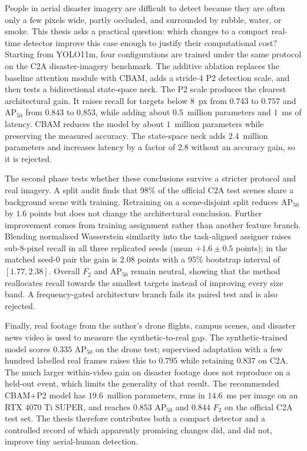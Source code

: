 
People in aerial disaster imagery are difficult to detect because they are
often only a few pixels wide, partly occluded, and surrounded by rubble, water,
or smoke. This thesis asks a practical question: which changes to a compact
real-time detector improve this case enough to justify their computational
cost? Starting from YOLO11m, four configurations are trained under the same
protocol on the C2A disaster-imagery benchmark. The additive ablation replaces
the baseline attention module with CBAM, adds a stride-4 P2 detection scale,
and then tests a bidirectional state-space neck. The P2 scale produces the
clearest architectural gain. It raises recall for targets below 8~px from
$0.743$ to $0.757$ and $\mathrm{AP}_{50}$ from $0.843$ to $0.853$, while adding
about $0.5$~million parameters and $1$~ms of latency. CBAM reduces the model by
about $1$~million parameters while preserving the measured accuracy. The
state-space neck adds $2.4$~million parameters and increases latency by a
factor of 2.8 without an accuracy gain, so it is rejected.

The second phase tests whether these conclusions survive a stricter protocol
and real imagery. A split audit finds that 98\% of the official C2A test scenes
share a background scene with training. Retraining on a scene-disjoint split
reduces $\mathrm{AP}_{50}$ by $1.6$ points but does not change the architectural
conclusion. Further improvement comes from training assignment rather than
another feature branch. Blending normalised Wasserstein similarity into the
task-aligned assigner raises sub-8-pixel recall in all three replicated seeds
(mean $+1.6\pm0.5$ points); in the matched seed-0 pair the gain is $2.08$
points with a 95\% bootstrap interval of $[1.77,2.38]$. Overall $F_2$ and
$\mathrm{AP}_{50}$ remain neutral, showing that the method reallocates recall
towards the smallest targets instead of improving every size band. A
frequency-gated architecture branch fails its paired test and is also rejected.

Finally, real footage from the author's drone flights, campus scenes, and
disaster news video is used to measure the synthetic-to-real gap. The
synthetic-trained model scores $0.335$ $\mathrm{AP}_{50}$ on the drone test;
supervised adaptation with a few hundred labelled real frames raises this to
$0.795$ while retaining $0.837$ on C2A. The much larger within-video gain on
disaster footage does not reproduce on a held-out event, which limits the
generality of that result. The recommended CBAM+P2 model has $19.6$~million
parameters, runs in $14.6$~ms per image on an RTX 4070 Ti SUPER, and reaches
$0.853$ $\mathrm{AP}_{50}$ and $0.844$ $F_2$ on the official C2A test set. The
thesis therefore contributes both a compact detector and a controlled
record of which apparently promising changes did, and did not, improve tiny
aerial-human detection.

